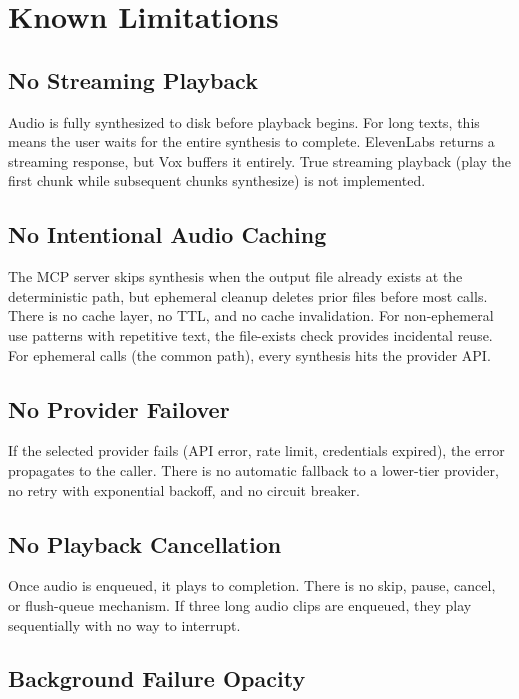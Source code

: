 \documentclass[a4paper,10pt]{article}
\begin{document}
\section{Known Limitations}

\subsection{No Streaming Playback}

Audio is fully synthesized to disk before playback begins.  For
long texts, this means the user waits for the entire synthesis to
complete.  ElevenLabs returns a streaming response, but Vox
buffers it entirely.  True streaming playback (play the first
chunk while subsequent chunks synthesize) is not implemented.

\subsection{No Intentional Audio Caching}

The MCP server skips synthesis when the output file already exists
at the deterministic path, but ephemeral cleanup deletes prior
files before most calls.  There is no cache layer, no TTL, and
no cache invalidation.  For non-ephemeral use patterns with
repetitive text, the file-exists check provides incidental
reuse.  For ephemeral calls (the common path), every synthesis
hits the provider API.

\subsection{No Provider Failover}

If the selected provider fails (API error, rate limit,
credentials expired), the error propagates to the caller.  There
is no automatic fallback to a lower-tier provider, no retry with
exponential backoff, and no circuit breaker.

\subsection{No Playback Cancellation}

Once audio is enqueued, it plays to completion.  There is no skip,
pause, cancel, or flush-queue mechanism.  If three long audio
clips are enqueued, they play sequentially with no way to
interrupt.

\subsection{Background Failure Opacity}
\end{document}
